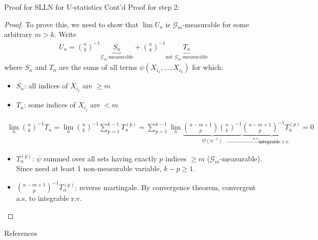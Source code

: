 \documentclass{beamer}
\theoremstyle{definition}
\numberwithin{Def}{section}
\begin{document}
\begin{frame}{Proof for SLLN for U-statistics Cont'd}
Proof for step 2:
\begin{fontsize}{6}{12}
\begin{proof}
To prove this, we need to show that $\lim U_n$ is $\mathcal{G}_m$-measurable for some arbitrary $m>k$. Write
\begin{align*}
U_n={n\choose k}^{-1}\underbrace{S_n}_{\mathcal{G}_m\text{-measurable}}+{n\choose k}^{-1}\underbrace{T_n}_{\text{not } \mathcal{G}_m\text{-measurable}}
\end{align*}
where $S_n$ and $T_n$ are the sums of all terms $\psi(X_{i_1},\dotsc,X_{i_k})$ for which:
\begin{itemize}
    \item $S_n$: all indices of $X_{i_j}$ are $\ge m$
    \item $T_n$: some indices of $X_{i_j}$ are $< m$
\end{itemize}
\begin{align*}
\lim_n {n\choose k}^{-1} T_n=\lim_n {n\choose k}^{-1} \sum_{p=1}^{k-1}T_n^{(p)}=\sum_{p=1}^{k-1}\lim_n\underbrace{ {{n-m+1}\choose p}{n\choose k}^{-1}}_{\mathcal{O}(n^{-1})}\underbrace{{{n-m+1}\choose p}^{-1}T_n^{(p)}}_{\xrightarrow{a.s.}\text{integrable r.v.}}=0
\end{align*}
\begin{itemize}
    \item $T_n^{(p)}$: $\psi$ summed over all sets having exactly $p$ indices $\ge m$ ($\mathcal{G}_m$-measurable). Since need at least 1 non-measurable variable, $k-p\ge1$.
    \item ${{n-m+1}\choose p}^{-1}T_n^{(p)}$: reverse martingale. By convergence theorem, convergent a.s. to integrable r.v.
\end{itemize}
\end{proof}
\end{fontsize}
\end{frame}

\begin{frame}{References}
\printbibliography
\end{frame}
\end{document}
